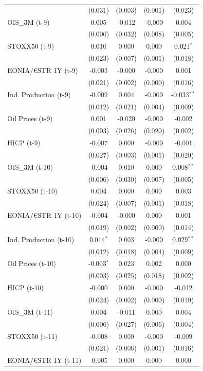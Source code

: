 \begin{longtable}[t]{lcccc}
 & (0.031) & (0.003) & (0.001) & (0.023)\\
OIS\_3M (t-9) & 0.005 & -0.012 & -0.000 & 0.004\\
 & (0.006) & (0.032) & (0.008) & (0.005)\\
STOXX50 (t-9) & 0.010 & 0.000 & 0.000 & 0.021$^{*}$\\
 & (0.023) & (0.007) & (0.001) & (0.018)\\
EONIA/€STR 1Y (t-9) & -0.003 & -0.000 & -0.000 & 0.001\\
 & (0.021) & (0.002) & (0.000) & (0.016)\\
Ind. Production (t-9) & -0.009 & 0.004 & -0.000 & -0.033$^{**}$\\
 & (0.012) & (0.021) & (0.004) & (0.009)\\
Oil Prices (t-9) & 0.001 & -0.020 & -0.000 & -0.002\\
 & (0.003) & (0.026) & (0.020) & (0.002)\\
HICP (t-9) & -0.007 & 0.000 & -0.000 & -0.001\\
 & (0.027) & (0.003) & (0.001) & (0.020)\\
OIS\_3M (t-10) & -0.004 & 0.010 & 0.000 & 0.008$^{**}$\\
 & (0.006) & (0.030) & (0.007) & (0.005)\\
STOXX50 (t-10) & 0.004 & 0.000 & 0.000 & 0.003\\
 & (0.024) & (0.007) & (0.001) & (0.018)\\
EONIA/€STR 1Y (t-10) & -0.004 & -0.000 & 0.000 & 0.001\\
 & (0.019) & (0.002) & (0.000) & (0.014)\\
Ind. Production (t-10) & 0.014$^{*}$ & 0.003 & -0.000 & 0.029$^{**}$\\
 & (0.012) & (0.018) & (0.004) & (0.009)\\
Oil Prices (t-10) & -0.003$^{*}$ & 0.023 & 0.002 & 0.000\\
 & (0.003) & (0.025) & (0.018) & (0.002)\\
HICP (t-10) & -0.000 & 0.000 & -0.000 & -0.012\\
 & (0.024) & (0.002) & (0.000) & (0.019)\\
OIS\_3M (t-11) & 0.004 & -0.011 & 0.000 & 0.004\\
 & (0.006) & (0.027) & (0.006) & (0.004)\\
STOXX50 (t-11) & -0.008 & 0.000 & -0.000 & -0.009\\
 & (0.021) & (0.006) & (0.001) & (0.016)\\
EONIA/€STR 1Y (t-11) & -0.005 & 0.000 & 0.000 & 0.000\\

\end{longtable}

